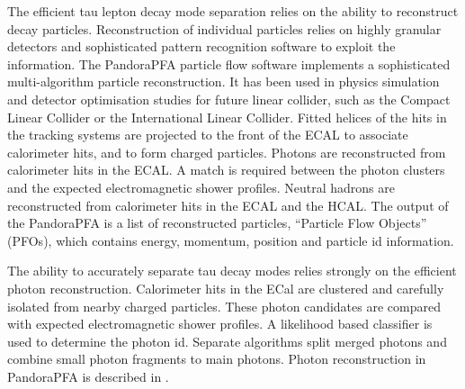 \documentclass[a4paper,11pt]{article}
\begin{document}
The efficient tau lepton decay mode separation relies on the ability to reconstruct decay particles. Reconstruction of individual particles relies on highly granular detectors and sophisticated pattern recognition software to exploit the information. The PandoraPFA \cite{Marshall:2015rfa} particle flow software implements a sophisticated multi-algorithm particle reconstruction. It has been used in physics simulation  and detector optimisation studies for future linear collider, such as the Compact Linear Collider\cite{Linssen:2012hp} or the International Linear Collider\cite{Brau:2007zza}. Fitted helices of the hits in the tracking systems are projected to the front of the ECAL to associate calorimeter hits, and to form charged particles. Photons are reconstructed from calorimeter hits in the ECAL. A match is required between the photon clusters and the expected electromagnetic shower profiles. Neutral hadrons are reconstructed from calorimeter hits in the ECAL and the HCAL. The output of the PandoraPFA is a list of reconstructed particles, ``Particle Flow Objects'' (PFOs), which contains energy, momentum, position and particle id information.






The ability to accurately separate tau decay modes relies strongly on the efficient  photon reconstruction. Calorimeter hits in the ECal are clustered and carefully isolated from nearby charged particles. These photon candidates are compared with expected electromagnetic shower profiles. A likelihood based classifier is used to determine the photon id. Separate algorithms split merged photons and combine small photon fragments to main photons. Photon reconstruction in PandoraPFA is described in \cite{Xu:2016rcz}.

\end{document}
